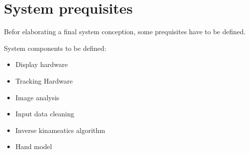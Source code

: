 \chapter{System prequisites}

Befor elaborating a final system conception, some prequisites have to be defined.

System components to be defined:
\begin{itemize}
 \item Display hardware
 \item Tracking Hardware
 \item Image analysis
 \item Input data cleaning
 \item Inverse kinameatics algorithm
 \item Hand model
 \end{itemize} 

